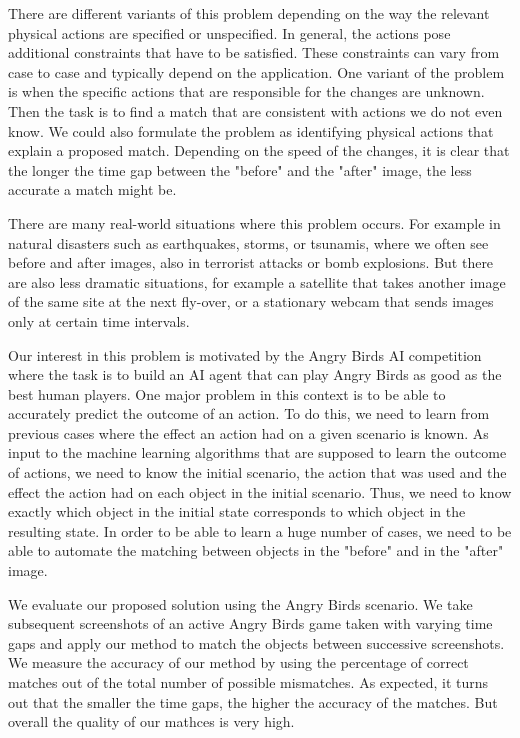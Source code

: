 \documentclass[letterpaper]{article}
\begin{document}
There are different variants of this problem depending on the way the relevant physical actions are specified or unspecified. In general, the actions pose additional constraints that have to be satisfied. These constraints can vary from case to case and typically depend on the application. One variant of the problem is when the specific actions that are responsible for the changes are unknown. 
Then the task is to find a match that are consistent with actions we do not even know. 
We could also formulate the problem as identifying physical actions that explain a proposed match.
Depending on the speed of the changes, it is clear that the longer the time gap between the "before" and the "after" image, the less accurate a match might be.

There are many real-world situations where this problem occurs. For example in natural disasters such as earthquakes, storms, or tsunamis, where we often see before and after images, also in terrorist attacks or bomb explosions. But there are also less dramatic situations, for example a satellite that takes another image of the same site at the next fly-over, or a stationary webcam that sends images only at certain time intervals. 

Our interest in this problem is motivated by the Angry Birds AI competition \cite{abCompetition} where the task is to build an AI agent that can play Angry Birds as good as the best human players. One major problem in this context is to be able to accurately predict the outcome of an action. To do this, we need to learn from previous cases where the effect an action had on a given scenario is known. As input to the machine learning algorithms that are supposed to learn the outcome of actions, we need to know the initial scenario, the action that was used and the effect the action had on each object in the initial scenario. Thus, we need to know exactly which object in the initial state corresponds to which object in the resulting state. In order to be able to learn a huge number of cases, we need to be able to automate the matching between objects in the "before" and in the "after" image.

We evaluate our proposed solution using the Angry Birds scenario. We take subsequent screenshots of an active Angry Birds game taken with varying time gaps and apply our method to match the objects between successive screenshots. We measure the accuracy of our method by using the percentage of correct matches out of the total number of possible mismatches. As expected, it turns out that the smaller the time gaps, the higher the accuracy of the matches. But overall the quality of our mathces is very high. 
\end{document}

